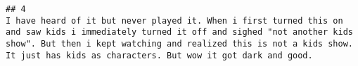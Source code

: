 \documentclass[
]{article}
\begin{document}
\begin{verbatim}
## 4                                                                                                                                                                                                                                                                                                                                                                                                                                                                                                                                                                                                                                                                                                                                                                                                                                                                                                                                                                                                                                                                                                                                                                                                                                                                                                                                                                                                                                                                                                                                                                                                                                                                                                                                                                                                                                                                                                                                                                                                                                                                                                                                                                                                                                                                                                                                                                                                                                                                                                                                                                                                                                                                                                                                                                                     I have heard of it but never played it. When i first turned this on and saw kids i immediately turned it off and sighed "not another kids show". But then i kept watching and realized this is not a kids show. It just has kids as characters. But wow it got dark and good.

\end{verbatim}
\end{document}
